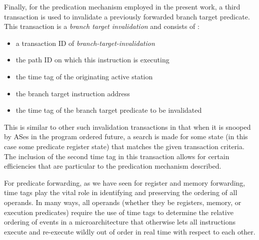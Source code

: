 \documentclass[10pt,dvips]{article}
\begin{document}
Finally, for the predication mechanism employed in the present
work, a third transaction is used to invalidate a previously
forwarded branch target predicate.  This transaction is
a \textit{branch target invalidation} and consists of :
%
\vspace{-0.05in}
\begin{itemize}
\vspace{-0.1in}
\item{a transaction ID of \textit{branch-target-invalidation}}
\vspace{-0.1in}
\item{the path ID on which this instruction is executing}
\vspace{-0.1in}
\item{the time tag of the originating active station}
\vspace{-0.1in}
\item{the branch target instruction address}
\vspace{-0.1in}
\item{the time tag of the branch target predicate to be invalidated}
\vspace{-0.1in}
\end{itemize}   
%
This is similar to other such invalidation transactions in
that when it is snooped by ASes in the program ordered future,
a search is made for some state (in this case some predicate
register state) that matches the given transaction criteria.
The inclusion of the second time tag in this transaction allows
for certain efficiencies that are particular to the predication
mechanism described.

For predicate forwarding, as we have seen for register and
memory forwarding, time tags play the vital role in
identifying and preserving the ordering of all operands.
In many ways, all operands (whether they be registers, memory,
or execution predicates) require the use of time tags to
determine the relative ordering of events in a microarchitecture
that otherwise lets all instructions execute and re-execute
wildly out of order in real time with respect to each other.
%
%
\end{document}
